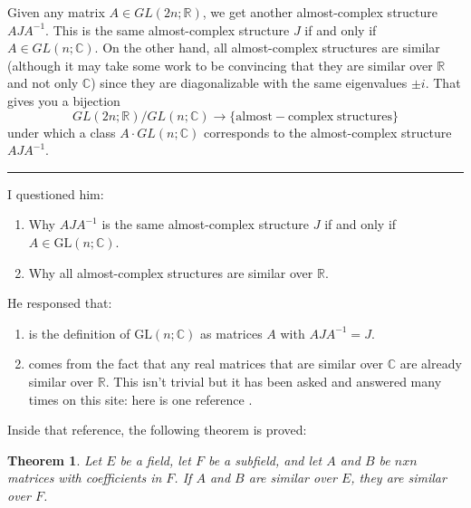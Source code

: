 \documentclass{article}
\numberwithin{equation}{subsection} %
\newtheorem{thm}{Theorem}[section]
\theoremstyle{definition}
\begin{document}
        Given any matrix $A \in GL(2n;\mathbb{R})$, we get another 
        almost-complex structure $AJA^{-1}$. This is the same 
        almost-complex structure $J$ if and only if 
        $A \in GL(n;\mathbb{C}).$ On the other hand, all almost-complex 
        structures are similar (although it may take some work to be 
        convincing that they are similar over $\mathbb{R}$ and not 
        only $\mathbb{C}$) since they are diagonalizable with the same 
        eigenvalues $\pm i$. That gives you a bijection 
        $$
            GL(2n;\mathbb{R}) / GL(n;\mathbb{C}) \longrightarrow 
            \{\mathrm{almost}-\mathrm{complex}\; 
            \mathrm{structures}\}
        $$ 
        under which a class $A \cdot GL(n;\mathbb{C})$ corresponds 
        to the almost-complex structure $AJA^{-1}.$

        \begin{center}\noindent\rule{8cm}{0.4pt}\end{center}

        I questioned him:
        \begin{enumerate}
            \item Why $AJA^{-1}$ is the same almost-complex structure 
                $J$ if and only if $A\in \mathrm{GL}(n;\mathbb{C})$. 
            \item Why all almost-complex structures are similar over 
                $\mathbb{R}$.
        \end{enumerate}
        He responsed that:
        \begin{enumerate}
            \item is the definition of $\mathrm{GL}(n;\mathbb{C})$
                as matrices $A$ with $AJA^{-1}=J$.
            \item comes from the fact that any real matrices that are 
                similar over $\mathbb{C}$ are already similar over 
                $\mathbb{R}$. This isn't trivial but it has been asked 
                and answered many times on this site: here is one 
                reference \cite{math.se_4}.
        \end{enumerate}

        Inside that reference, the following theorem is proved:

        \begin{thm}
            Let $E$ be a field, let $F$ be a subfield, and let $A$ and
            $B$ be $nxn$ matrices with coefficients in $F$. If $A$ and
            $B$ are similar over $E$, they are similar over $F$.
        \end{thm}
\end{document}

